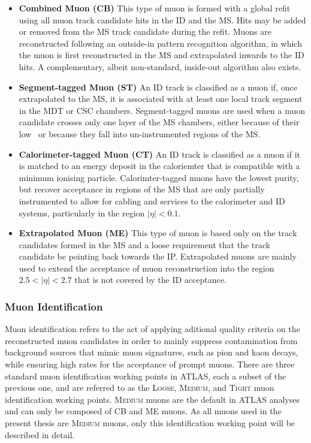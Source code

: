 \begin{itemize}
    \item{\textbf{Combined Muon (CB)}} This type of muon is formed with a global refit using all muon track candidate hits
        in the ID and the MS. Hits may be added or removed from the MS track candidate during the refit.
        Muons are reconstructed following an outside-in pattern recognition algorithm, in which the
        muon is first reconstructed in the MS and extrapolated inwards to the ID hits.
        A complementary, albeit non-standard, inside-out algorithm also exists.
    \item{\textbf{Segment-tagged Muon (ST)}} An ID track is classified as a muon if, once extrapolated to the MS,
        it is associated with at least one local track segment in the MDT or CSC chambers. Segment-tagged muons
        are used when a muon candidate crosses only one layer of the MS chambers, either because of their
        low \pT~or because they fall into un-instrumented regions of the MS.
    \item{\textbf{Calorimeter-tagged Muon (CT)}} An ID track is classified as a muon if it is matched to an
        energy deposit in the caloriemter that is compatible with a minimum ionising particle.
        Calorimter-tagged muons have the lowest purity, but recover acceptance in regions of the MS
        that are only partially instrumented to allow for cabling and services to the calorimeter and ID systems,
        particularly in the region $\lvert \eta \rvert < 0.1$.
    \item{\textbf{Extrapolated Muon (ME)}} This type of muon is based only on the track candidates formed in the MS
        and a loose requirement that the track candidate be pointing back towards the IP.
        Extrapolated muons are mainly used to extend the acceptance of muon reconstruction into the region
        $2.5 < \lvert \eta \rvert < 2.7$ that is not covered by the ID acceptance.
\end{itemize}

\subsubsection{Muon Identification}
\label{sec:muon_id}

Muon identification refers to the act of applying aditional quality criteria on
the reconstructed muon candidates in order to mainly suppress contamination from
background sources that mimic muon signatures, such as pion and kaon decays, 
while ensuring high rates for the acceptance of prompt muons.
There are three standard muon identification working points in ATLAS, each
a subset of the previous one, and are referred to as the \textsc{Loose},
\textsc{Medium}, and \textsc{Tight} muon identification working points.
\textsc{Medium} muons are the default in ATLAS analyses and can only be composed
of CB and ME muons.
As all muons used in the present thesis are \textsc{Medium} muons, only this
identification working point will be described in detail.

